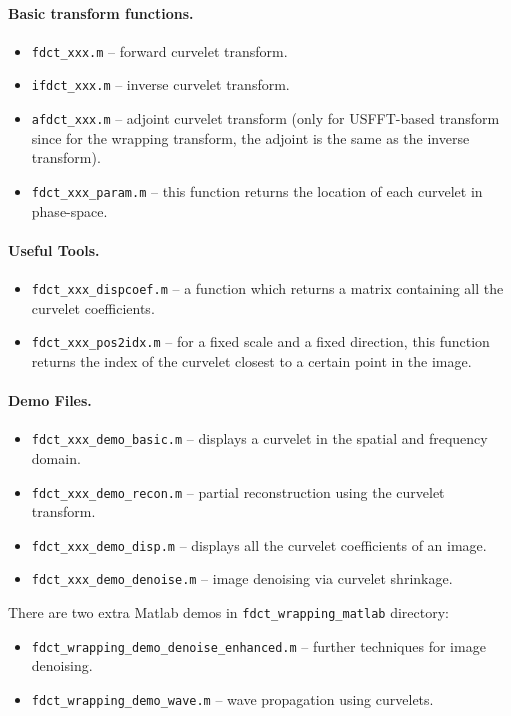 \documentclass[11pt]{article}
\begin{document}
\paragraph{Basic transform functions.}
\begin{itemize}
\item  \verb=fdct_xxx.m= -- forward curvelet transform.
\item  \verb=ifdct_xxx.m= -- inverse curvelet transform.
\item  \verb=afdct_xxx.m= -- adjoint curvelet transform (only for
  USFFT-based transform since for the wrapping transform, the adjoint 
  is the same as the inverse transform).
\item \verb=fdct_xxx_param.m= -- this function returns the location of
  each curvelet in phase-space.
\end{itemize}

\paragraph{Useful Tools.}
\begin{itemize}
\item  \verb=fdct_xxx_dispcoef.m= -- a function which returns a matrix
  containing all the curvelet coefficients.
\item  \verb=fdct_xxx_pos2idx.m= -- for a fixed scale and a fixed
  direction, this function returns the index of the curvelet closest
  to a certain point in the image.
\end{itemize}

\paragraph{Demo Files.}
\begin{itemize}
\item  \verb=fdct_xxx_demo_basic.m= -- displays a curvelet in the spatial and frequency domain.
\item  \verb=fdct_xxx_demo_recon.m= -- partial reconstruction using the curvelet transform.
\item  \verb=fdct_xxx_demo_disp.m= -- displays all the curvelet coefficients of an image.
\item  \verb=fdct_xxx_demo_denoise.m= -- image denoising via curvelet shrinkage.
\end{itemize}

There are two extra Matlab demos in \verb=fdct_wrapping_matlab= directory:
\begin{itemize}
\item \verb=fdct_wrapping_demo_denoise_enhanced.m= -- further techniques for image denoising.
\item \verb=fdct_wrapping_demo_wave.m= -- wave propagation using curvelets.
\end{itemize}
\end{document}
